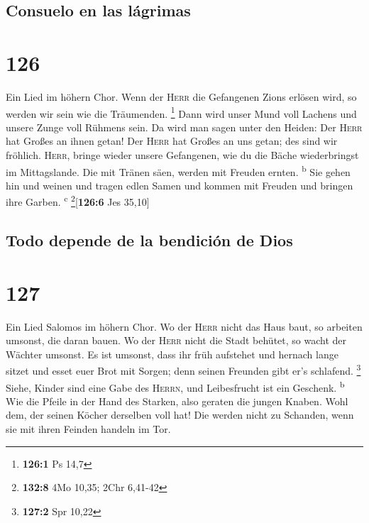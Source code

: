 \hypertarget{consuelo-en-las-luxe1grimas}{%
\subsection{Consuelo en las
lágrimas}\label{consuelo-en-las-luxe1grimas}}

\hypertarget{section-125}{%
\section{126}\label{section-125}}

 Ein Lied im höhern Chor. Wenn der \textsc{Herr} die
Gefangenen Zions erlösen wird, so werden wir sein wie die Träumenden.
\footnote{\textbf{126:1} Ps 14,7}  Dann wird unser Mund
voll Lachens und unsere Zunge voll Rühmens sein. Da wird man sagen unter
den Heiden: Der \textsc{Herr} hat Großes an ihnen getan! 
Der \textsc{Herr} hat Großes an uns getan; des sind wir fröhlich.
 \textsc{Herr}, bringe wieder unsere Gefangenen, wie du
die Bäche wiederbringst im Mittagslande.  Die mit Tränen
säen, werden mit Freuden ernten. \textsuperscript{b}  Sie
gehen hin und weinen und tragen edlen Samen und kommen mit Freuden und
bringen ihre Garben. \textsuperscript{c} \footnote{\textbf{132:8} 4Mo
  10,35; 2Chr 6,41-42}{[}\textbf{126:6} Jes 35,10{]}

\hypertarget{todo-depende-de-la-bendiciuxf3n-de-dios}{%
\subsection{Todo depende de la bendición de
Dios}\label{todo-depende-de-la-bendiciuxf3n-de-dios}}

\hypertarget{section-126}{%
\section{127}\label{section-126}}

 Ein Lied Salomos im höhern Chor. Wo der \textsc{Herr}
nicht das Haus baut, so arbeiten umsonst, die daran bauen. Wo der
\textsc{Herr} nicht die Stadt behütet, so wacht der Wächter umsonst.
 Es ist umsonst, dass ihr früh aufstehet und hernach lange
sitzet und esset euer Brot mit Sorgen; denn seinen Freunden gibt er's
schlafend. \footnote{\textbf{127:2} Spr 10,22}  Siehe,
Kinder sind eine Gabe des \textsc{Herrn}, und Leibesfrucht ist ein
Geschenk. \textsuperscript{b}  Wie die Pfeile in der Hand
des Starken, also geraten die jungen Knaben.  Wohl dem,
der seinen Köcher derselben voll hat! Die werden nicht zu Schanden, wenn
sie mit ihren Feinden handeln im Tor.

